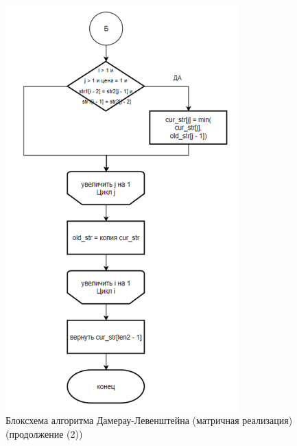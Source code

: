 \begin{figure}[H]
    \centering
    \includegraphics[width=0.8\textwidth]{img/block_2_1_3.png}
    \caption{Блоксхема алгоритма Дамерау-Левенштейна (матричная реализация) (продолжение (2))}
\end{figure}

